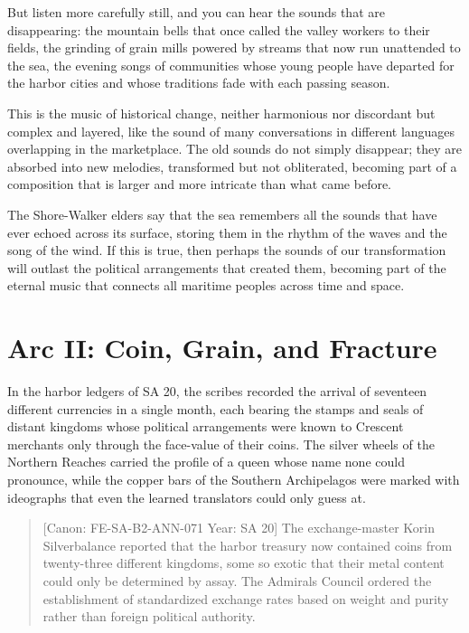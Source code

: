 But listen more carefully still, and you can hear the sounds that are
disappearing: the mountain bells that once called the valley workers to
their fields, the grinding of grain mills powered by streams that now
run unattended to the sea, the evening songs of communities whose young
people have departed for the harbor cities and whose traditions fade
with each passing season.

This is the music of historical change, neither harmonious nor
discordant but complex and layered, like the sound of many conversations
in different languages overlapping in the marketplace. The old sounds do
not simply disappear; they are absorbed into new melodies, transformed
but not obliterated, becoming part of a composition that is larger and
more intricate than what came before.

The Shore-Walker elders say that the sea remembers all the sounds that
have ever echoed across its surface, storing them in the rhythm of the
waves and the song of the wind. If this is true, then perhaps the sounds
of our transformation will outlast the political arrangements that
created them, becoming part of the eternal music that connects all
maritime peoples across time and space.

\section{Arc II: Coin, Grain, and
Fracture}\label{arc-ii-coin-grain-and-fracture}

In the harbor ledgers of SA 20, the scribes recorded the arrival of
seventeen different currencies in a single month, each bearing the
stamps and seals of distant kingdoms whose political arrangements were
known to Crescent merchants only through the face-value of their coins.
The silver wheels of the Northern Reaches carried the profile of a queen
whose name none could pronounce, while the copper bars of the Southern
Archipelagos were marked with ideographs that even the learned
translators could only guess at.

\begin{quote}
{[}Canon: FE-SA-B2-ANN-071 \textbar{} Year: SA 20{]} The exchange-master
Korin Silverbalance reported that the harbor treasury now contained
coins from twenty-three different kingdoms, some so exotic that their
metal content could only be determined by assay. The
Admiral\textquotesingle s Council ordered the establishment of
standardized exchange rates based on weight and purity rather than
foreign political authority.
\end{quote}

